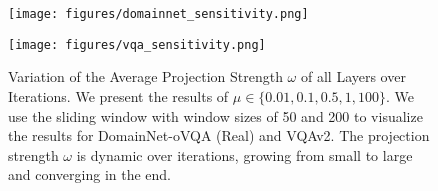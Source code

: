 \begin{figure}[!h]
    \centering
    \begin{minipage}[b]{0.45\textwidth}
        \centering
        \texttt{[image: figures/domainnet\_sensitivity.png]}
    \end{minipage}
    \hspace{0.05\textwidth}  %
    \begin{minipage}[b]{0.45\textwidth}
        \centering
        \texttt{[image: figures/vqa\_sensitivity.png]}
    \end{minipage}
    
    \caption{Variation of the Average Projection Strength $\omega$ of all Layers over Iterations. We present the results of $\mu \in \{0.01, 0.1, 0.5, 1, 100\}$. We use the sliding window with window sizes of 50 and 200 to visualize the results for DomainNet-oVQA (Real) and VQAv2. The projection strength $\omega$ is dynamic over iterations, growing from small to large and converging in the end.}
    \label{fig:variation}
\end{figure}